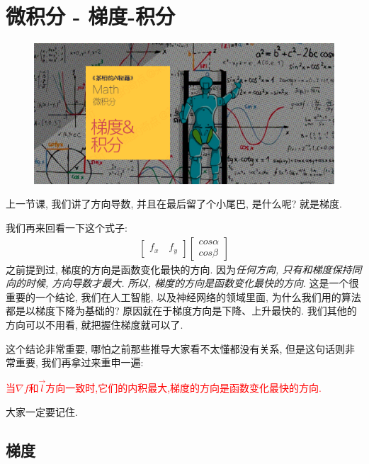 \chapter{微积分 - 梯度-积分}

\begin{figure}[ht]
  \centering
  \includegraphics[width=1\textwidth]{asset/20230901221347.png}
\end{figure}

\newpage

上一节课, 我们讲了方向导数, 并且在最后留了个小尾巴, 是什么呢? 就是梯度. 

我们再来回看一下这个式子:
\begin{align*}
  \begin{bmatrix} f_x \quad f_y  \end{bmatrix}
  \begin{bmatrix} cos \alpha \\ cos \beta \end{bmatrix}
\end{align*}
之前提到过, 梯度的方向是函数变化最快的方向. 因为\textit{任何方向, 只有和梯度保持同向的时候, 方向导数才最大. 所以, 梯度的方向是函数变化最快的方向}. 这是一个很重要的一个结论, 我们在人工智能, 以及神经网络的领域里面, 为什么我们用的算法都是以梯度下降为基础的? 原因就在于梯度方向是下降、上升最快的. 我们其他的方向可以不用看, 就把握住梯度就可以了. 

这个结论非常重要, 哪怕之前那些推导大家看不太懂都没有关系, 但是这句话则非常重要, 我们再拿过来重申一遍:

\textcolor{red}{当$\nabla f$和$\vec l$方向一致时,它们的内积最大,梯度的方向是函数变化最快的方向. }

大家一定要记住. 

\section{梯度}

